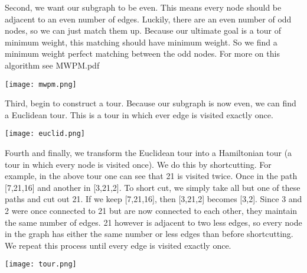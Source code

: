 \documentclass{article}
\begin{document}
        Second, we want our subgraph to be even.
        This means every node should be adjacent to an even number of edges.
        Luckily, there are an even number of odd nodes, so we can just
        match them up.
        Because our ultimate goal is a tour of minimum weight, this matching should
        have minimum weight.
        So we find a minimum weight perfect matching between the odd nodes.
        For more on this algorithm see MWPM.pdf
        \begin{center}
            \texttt{[image: mwpm.png]}
        \end{center}

        Third, begin to construct a tour.
        Because our subgraph is now even, we can find a Euclidean tour.
        This is a tour in which ever edge is visited exactly once.
        \begin{center}
            \texttt{[image: euclid.png]}
        \end{center}

        Fourth and finally, we transform the Euclidean tour into a Hamiltonian tour (a tour in which every node
        is visited once).
        We do this by shortcutting.
        For example, in the above tour one can see that 21 is visited twice.
        Once in the path [7,21,16] and another in [3,21,2].
        To short cut, we simply take all but one of these paths and cut out 21.
        If we keep [7,21,16], then [3,21,2] becomes [3,2].
        Since 3 and 2 were once connected to 21 but are now connected
        to each other, they maintain the same number of edges.
        21 however is adjacent to two less edges, so every node in the graph has either
        the same number or less edges than before shortcutting.
        We repeat this process until every edge is visited exactly once.
        \begin{center}
            \texttt{[image: tour.png]}
        \end{center}
\end{document}

